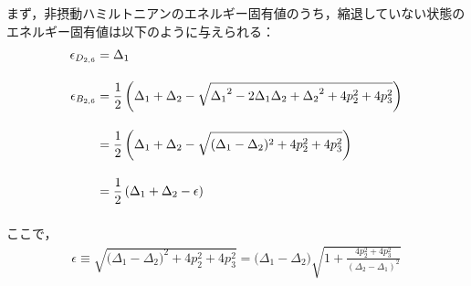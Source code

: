 まず，非摂動ハミルトニアンのエネルギー固有値のうち，縮退していない状態のエネルギー固有値は以下のように与えられる：
\begin{align}
    \epsilon_{D_{2,6}}&=
    {\Delta_{1}}\\[10pt]
    \epsilon_{B_{2,6}}&=
    \frac{1}{2}\left({\Delta_{1}}+{\Delta_{2}}-\sqrt{{\Delta_{1}}^2-2{\Delta_{1}}{\Delta_{2}}+{\Delta_{2}}^2+4p_2^2+4p_3^2}\right)\nn[10pt]
    &=\frac{1}{2}\left({\Delta_{1}}+{\Delta_{2}}-\sqrt{{
    (\Delta_{1}}-\Delta_{2})^2+4p_2^2+4p_3^2}\right)\nn[10pt]
    &=\frac{1}{2}\left({\Delta_{1}}+{\Delta_{2}}-\epsilon\right)\nn[10pt]
\end{align}
ここで，
\begin{align}
    \epsilon\equiv
    \sqrt{{
    (\Delta_{1}}-\Delta_{2})^2+4p_2^2+4p_3^2}
    ={(\Delta_{1}}-\Delta_{2})
    \sqrt{1+\frac{4p_2^2+4p_3^2}{(\Delta_{2}-\Delta_{1})^2}}
\end{align}

